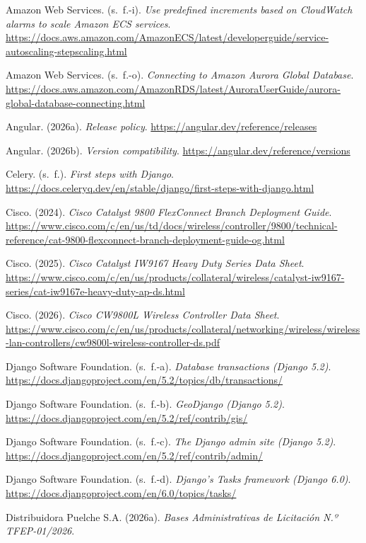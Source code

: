 \begin{list}{}{\setlength{\leftmargin}{1.27cm}\setlength{\itemindent}{-1.27cm}\setlength{\itemsep}{0.5\baselineskip}\raggedright}
\item Amazon Web Services. (s.~f.-i). \textit{Use predefined increments based on CloudWatch alarms to scale Amazon ECS services}. \url{https://docs.aws.amazon.com/AmazonECS/latest/developerguide/service-autoscaling-stepscaling.html}
\item Amazon Web Services. (s.~f.-o). \textit{Connecting to Amazon Aurora Global Database}. \url{https://docs.aws.amazon.com/AmazonRDS/latest/AuroraUserGuide/aurora-global-database-connecting.html}
\item Angular. (2026a). \textit{Release policy}. \url{https://angular.dev/reference/releases}
\item Angular. (2026b). \textit{Version compatibility}. \url{https://angular.dev/reference/versions}
\item Celery. (s.~f.). \textit{First steps with Django}. \url{https://docs.celeryq.dev/en/stable/django/first-steps-with-django.html}
\item Cisco. (2024). \textit{Cisco Catalyst 9800 FlexConnect Branch Deployment Guide}. \url{https://www.cisco.com/c/en/us/td/docs/wireless/controller/9800/technical-reference/cat-9800-flexconnect-branch-deployment-guide-og.html}
\item Cisco. (2025). \textit{Cisco Catalyst IW9167 Heavy Duty Series Data Sheet}. \url{https://www.cisco.com/c/en/us/products/collateral/wireless/catalyst-iw9167-series/cat-iw9167e-heavy-duty-ap-ds.html}
\item Cisco. (2026). \textit{Cisco CW9800L Wireless Controller Data Sheet}. \url{https://www.cisco.com/c/en/us/products/collateral/networking/wireless/wireless-lan-controllers/cw9800l-wireless-controller-ds.pdf}
\item Django Software Foundation. (s.~f.-a). \textit{Database transactions (Django 5.2)}. \url{https://docs.djangoproject.com/en/5.2/topics/db/transactions/}
\item Django Software Foundation. (s.~f.-b). \textit{GeoDjango (Django 5.2)}. \url{https://docs.djangoproject.com/en/5.2/ref/contrib/gis/}
\item Django Software Foundation. (s.~f.-c). \textit{The Django admin site (Django 5.2)}. \url{https://docs.djangoproject.com/en/5.2/ref/contrib/admin/}
\item Django Software Foundation. (s.~f.-d). \textit{Django's Tasks framework (Django 6.0)}. \url{https://docs.djangoproject.com/en/6.0/topics/tasks/}
\item Distribuidora Puelche S.A. (2026a). \textit{Bases Administrativas de Licitación N.º TFEP-01/2026}.

\end{list}
